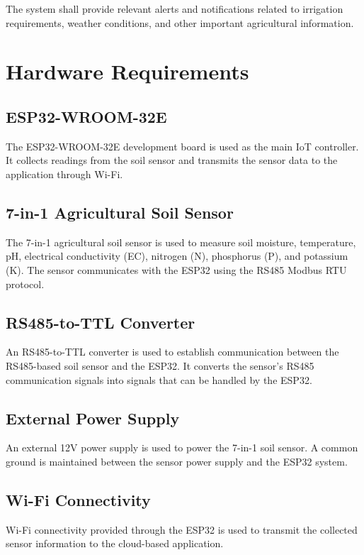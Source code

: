 The system shall provide relevant alerts and notifications related to irrigation requirements, weather conditions, and other important agricultural information.

\section{Hardware Requirements}

\subsection{ESP32-WROOM-32E}

The ESP32-WROOM-32E development board is used as the main IoT controller. It collects readings from the soil sensor and transmits the sensor data to the application through Wi-Fi.

\subsection{7-in-1 Agricultural Soil Sensor}

The 7-in-1 agricultural soil sensor is used to measure soil moisture, temperature, pH, electrical conductivity (EC), nitrogen (N), phosphorus (P), and potassium (K). The sensor communicates with the ESP32 using the RS485 Modbus RTU protocol.

\subsection{RS485-to-TTL Converter}

An RS485-to-TTL converter is used to establish communication between the RS485-based soil sensor and the ESP32. It converts the sensor's RS485 communication signals into signals that can be handled by the ESP32.

\subsection{External Power Supply}

An external 12V power supply is used to power the 7-in-1 soil sensor. A common ground is maintained between the sensor power supply and the ESP32 system.

\subsection{Wi-Fi Connectivity}

Wi-Fi connectivity provided through the ESP32 is used to transmit the collected sensor information to the cloud-based application.
\clearpage
